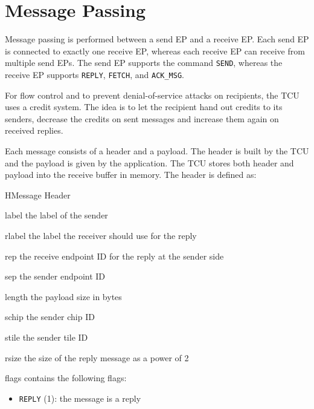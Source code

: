 \section{Message Passing}

Message passing is performed between a send EP and a receive EP. Each send EP is connected to
exactly one receive EP, whereas each receive EP can receive from multiple send EPs. The send EP
supports the command \texttt{SEND}, whereas the receive EP supports \texttt{REPLY}, \texttt{FETCH},
and \texttt{ACK\_MSG}.

For flow control and to prevent denial-of-service attacks on recipients, the TCU uses a credit
system. The idea is to let the recipient hand out credits to its senders, decrease the credits on
sent messages and increase them again on received replies.

Each message consists of a header and a payload. The header is built by the TCU and the payload is
given by the application. The TCU stores both header and payload into the receive buffer in memory.
The header is defined as:

\begin{register}{H}{Message Header}{}
  \regnewline%
  \regnewline%
  \regnewline%
  \regnewline%
  \begin{regdesc}\begin{reglist}
    \item[label] the label of the sender
    \item[rlabel] the label the receiver should use for the reply
    \item[rep] the receive endpoint ID for the reply at the sender side
    \item[sep] the sender endpoint ID
    \item[length] the payload size in bytes
    \item[schip] the sender chip ID
    \item[stile] the sender tile ID
    \item[rsize] the size of the reply message as a power of 2
    \item[flags] contains the following flags:
    \begin{itemize}
      \item \texttt{REPLY} (1): the message is a reply
    \end{itemize}
  \end{reglist}\end{regdesc}
\end{register}

